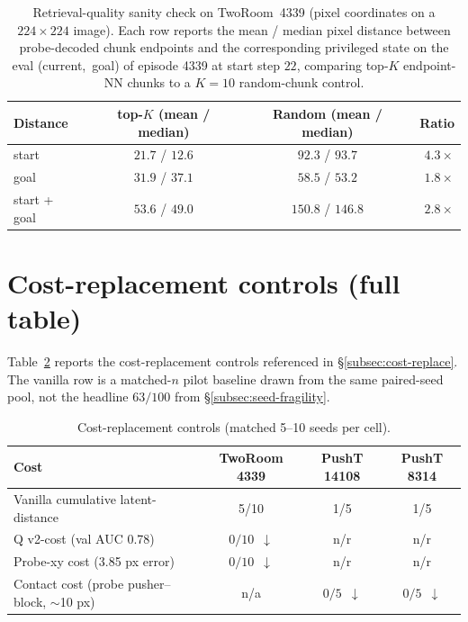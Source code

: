 \documentclass{article}
\begin{document}
\begin{table}[ht]
\centering\small
\caption{Retrieval-quality sanity check on TwoRoom~4339 (pixel coordinates on a $224\times224$ image). Each row reports the mean / median pixel distance between probe-decoded chunk endpoints and the corresponding privileged state on the eval (current,~goal) of episode 4339 at start step $22$, comparing top-$K$ endpoint-NN chunks to a $K{=}10$ random-chunk control.}
\label{tab:retrieval-quality}
\renewcommand{\arraystretch}{1.10}
\begin{tabular}{lccr}
\toprule
Distance & top-$K$ (mean / median) & Random (mean / median) & Ratio \\
\midrule
start                & $\mathbf{21.7}$ / $12.6$ & $\mathbf{92.3}$ / $93.7$  & $4.3\times$ \\
goal                 & $\mathbf{31.9}$ / $37.1$ & $\mathbf{58.5}$ / $53.2$  & $1.8\times$ \\
start + goal         & $\mathbf{53.6}$ / $49.0$ & $\mathbf{150.8}$ / $146.8$ & $2.8\times$ \\
\bottomrule
\end{tabular}
\end{table}

\section{Cost-replacement controls (full table)}
\label{app:cost-replacement}

Table~\ref{tab:cost} reports the cost-replacement controls referenced in \S\ref{subsec:cost-replace}. The vanilla row is a matched-$n$ pilot baseline drawn from the same paired-seed pool, not the headline $63/100$ from \S\ref{subsec:seed-fragility}.

\begin{table}[ht]
\centering\small
\caption{Cost-replacement controls (matched 5--10 seeds per cell).}
\label{tab:cost}
\begin{tabular}{lccc}
\toprule
Cost                                    & TwoRoom 4339 & PushT 14108  & PushT 8314 \\
\midrule
Vanilla cumulative latent-distance      & 5/10         & 1/5          & 1/5 \\
Q v2-cost (val AUC 0.78)                & $0/10$ \,$\downarrow$ & n/r & n/r \\
Probe-xy cost (3.85 px error)           & $0/10$ \,$\downarrow$ & n/r & n/r \\
Contact cost (probe pusher--block, $\sim$10 px) & n/a  & $0/5$ \,$\downarrow$ & $0/5$ \,$\downarrow$ \\
\bottomrule
\end{tabular}
\end{table}
\end{document}
